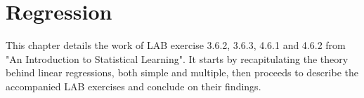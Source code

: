 \chapter{Regression} \label{ch:regression}

This chapter details the work of LAB exercise 3.6.2, 3.6.3, 4.6.1 and 4.6.2 from "An Introduction to Statistical Learning". It starts by recapitulating the theory behind linear regressions, both simple and multiple, then proceeds to describe the accompanied LAB exercises and conclude on their findings.



